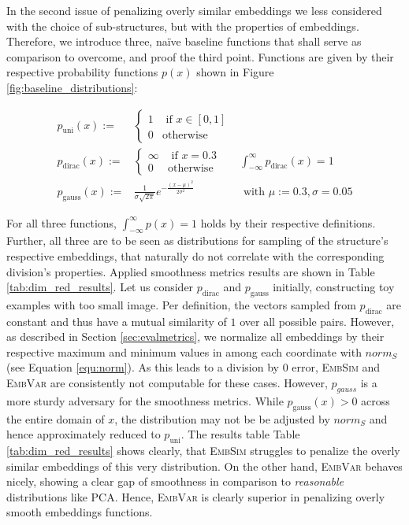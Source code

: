 \documentclass[]{article}
\begin{document}
In the second issue of penalizing overly similar embeddings we less considered with the choice of sub-structures, but with the properties of embeddings. Therefore, we introduce three, na\"ive baseline functions that shall serve as comparison to overcome, and proof the third point. Functions are given by their respective probability functions $p(x)$ shown in Figure \ref{fig:baseline_distributions}:

\begin{align}
	p_\text{uni}(x):=&\begin{cases}
		1 & \text{ if }x\in [0,1]\\
		0& \text{otherwise}
	\end{cases}&\\
	p_\text{dirac}(x):= &\begin{cases}
		\infty & \text{ if }x=0.3\\
		0& \text{otherwise}
	\end{cases} &\int_{-\infty}^{\infty}p_\text{dirac}(x)=1\\
	p_\text{gauss}(x):=&\frac{1}{{\sigma \sqrt {2\pi } }}e^{-\frac{(x-\mu)^2}{2\sigma^2}} &\text{ with }\mu:=0.3, \sigma=0.05
\end{align}

For all three functions, $\int_{-\infty}^{\infty}p(x)=1$ holds by their respective definitions. \\

Further, all three are to be seen as distributions for sampling of the structure's respective embeddings, that naturally do not correlate with the corresponding division's properties. Applied smoothness metrics results are shown in Table \ref{tab:dim_red_results}. Let us consider $p_\text{dirac}$ and $p_\text{gauss}$ initially, constructing toy examples with too small image. Per definition, the vectors sampled from $p_\text{dirac}$ are constant and thus have a mutual similarity of $1$ over all possible pairs. However, as described in Section \ref{sec:evalmetrics}, we normalize all embeddings by their respective maximum and minimum values in among each coordinate with $norm_S$ (see Equation \ref{equ:norm}). As this leads to a division by 0 error, \textsc{EmbSim} and \textsc{EmbVar} are consistently not computable for these cases. 
However, $p_{gauss}$ is a more sturdy adversary for the smoothness metrics. While $p_\text{gauss}(x)>0$ across the entire domain of $x$, the distribution may not be be adjusted by $norm_S$ and hence approximately reduced to $p_\text{uni}$. The results table Table \ref{tab:dim_red_results} shows clearly, that \textsc{EmbSim} struggles to penalize the overly similar embeddings of this very distribution. On the other hand, \textsc{EmbVar} behaves nicely, showing a clear gap of smoothness in comparison to \textit{reasonable} distributions like PCA. Hence, \textsc{EmbVar} is clearly superior in penalizing overly smooth embeddings functions.\\
\end{document}

